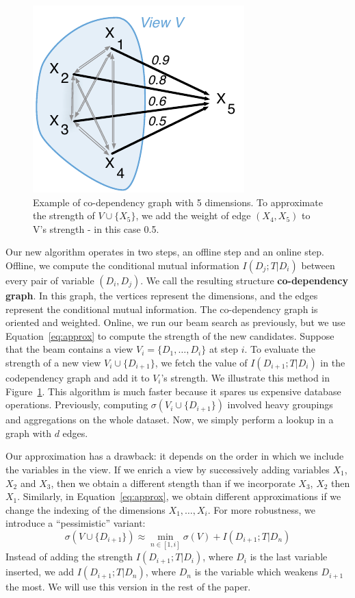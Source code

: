 \begin{figure}[t!]
\centering
\includegraphics[width=0.5\columnwidth]{images/codependency}
\caption{Example of co-dependency graph with 5 dimensions. To approximate the
strength of $V \cup \{X_5\}$, we add the weight of edge $(X_4, X_5)$ to V's
strength -  in this case 0.5.}
\label{pic:codependency}
\end{figure}
Our new algorithm operates in two steps, an offline step and an online step.
Offline, we compute the conditional mutual information  $ I(D_j ; T | D_i)$
between every pair of variable $(D_i, D_j)$. We call the resulting structure
\textbf{co-dependency graph}. In this graph, the vertices represent the
dimensions, and the edges represent the conditional mutual information. The
co-dependency graph is oriented and weighted.  Online, we run our beam search
as previously, but we use Equation~\ref{eq:approx} to compute the strength of
the new candidates.  Suppose that the beam contains a view $V_i= \{D_1, \ldots,
D_i\}$ at step $i$.  To evaluate the strength of a new view $V_i \cup
\{D_{i+1}\}$, we fetch the value of  $ I(D_{i+1} ; T | D_i)$ in the
codependency graph and add it to $V_i$'s strength. We illustrate this method in
Figure~\ref{pic:codependency}.  This algorithm is much faster because it spares
us expensive database operations. Previously, computing $\sigma(V_i \cup
\{D_{i+1}\})$ involved heavy groupings and aggregations on the whole dataset.
Now, we simply perform a lookup in a graph with $d$ edges.

Our approximation has a drawback: it depends on the order in which we include
the variables in the view. If we enrich a view by successively adding variables
$X_1$, $X_2$ and $X_3$, then we obtain a different stength than if we
incorporate $X_3$, $X_2$ then $X_1$. Similarly, in Equation~\ref{eq:approx}, we
obtain different approximations if we change the indexing of the dimensions
$X_1, \ldots, X_i$.  For more robustness, we introduce a ``pessimistic''
variant:
\begin{equation}\label{eq:robustapprox}
    \sigma(V \cup \{D_{i+1}\}) 
    \approx \min_{n \in [1, i]} \sigma(V) + I(D_{i+1} ; T | D_{n})
\end{equation}
Instead of adding the strength $I(D_{i+1}; T | D_i)$, where $D_i$ is the last
variable inserted, we add $I(D_{i+1}; T | D_n)$, where $D_n$ is the variable
which weakens $D_{i+1}$ the most. We will use this version in the rest of the
paper.

